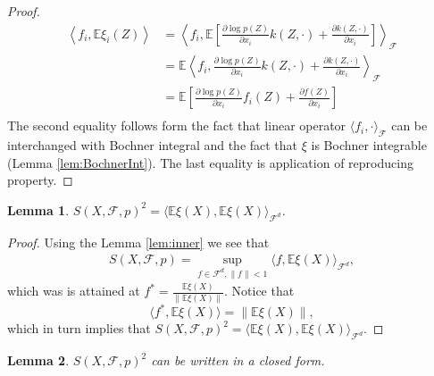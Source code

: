 \documentclass{article}
\newtheorem{lemma}{Lemma}
\newcommand{\ev}{\mathbb{E}}
\begin{document}
\begin{proof}
  \begin{align*}
 \left\langle f_i, \ev \xi_i(Z) \right\rangle  &= \left\langle f_i,\ev \left[ \frac{\partial \log p(Z)}{ \partial x_i} k(Z,\cdot)+ \frac{\partial k(Z,\cdot)}{ \partial x_i}\right]\right\rangle_{\mathcal{F}} \\
  &= \ev \left\langle f_i, \frac{\partial \log p(Z)}{ \partial x_i} k(Z,\cdot)+ \frac{\partial k(Z,\cdot)}{ \partial x_i}\right\rangle_{\mathcal{F}} \\
 &=\ev \left[ \frac{\partial \log p(Z)}{ \partial x_i} f_i(Z)+ \frac{\partial f(Z)}{ \partial x_i}\right]\\
\end{align*}
The second equality follows form the fact that linear operator $\langle f_i , \cdot \rangle_{\mathcal{F}}$ can be interchanged with Bochner integral and the fact that $\xi$ is Bochner integrable (Lemma \ref{lem:BochnerInt}). The last equality is application of reproducing property.    
\end{proof}

\begin{lemma}
$S(X,\mathcal{F},p)^2 = \langle \ev \xi(X), \ev \xi(X) \rangle_{\mathcal{F}^d } $. 
\end{lemma}
\begin{proof}
 Using the Lemma \ref{lem:inner} we see that 
 \begin{align}
  S(X,\mathcal{F},p) = \sup_{f \in \mathcal{F}^d, \| f \| <1 } \langle f ,\ev \xi(X) \rangle_{\mathcal{F}^d},
 \end{align}
which was is attained at $f^* = \frac{\ev \xi(X)} {\| \ev \xi(X) \| } $. Notice that 
 \[
  \langle f^*, \ev \xi(X) \rangle  = \| \ev \xi(X) \|,
 \]
 which in turn implies that $S(X,\mathcal{F},p)^2 = \langle \ev \xi(X), \ev \xi(X) \rangle_{\mathcal{F}^d }$. 
%  
 \end{proof}



\begin{lemma}
\label{th1}
$S(X,\mathcal{F},p)^2$ can be written in a closed form. 
\end{lemma}
\end{document}
